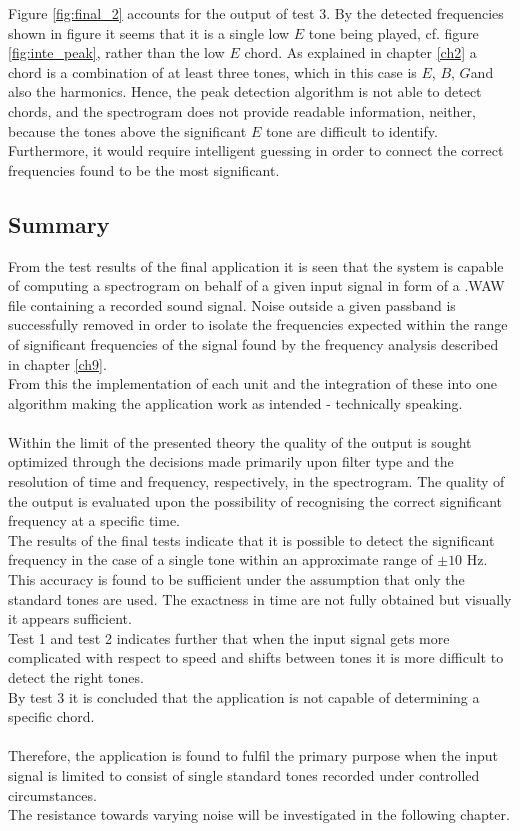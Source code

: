 Figure \ref{fig:final_2} accounts for the output of test 3. By the detected frequencies shown in figure \label{fig:final_peak2} it seems that it is a single low $E$ tone being played, cf. figure \ref{fig:inte_peak}, rather than the low $E$ chord. As explained in chapter \ref{ch2} a chord is a combination of at least three tones, which in this case is $E$, $B$, $G$\hashsharp and also the harmonics. Hence, the peak detection algorithm is not able to detect chords, and the spectrogram does not provide readable information, neither, because the tones above the significant $E$ tone are difficult to identify. Furthermore, it would require intelligent guessing in order to connect the correct frequencies found to be the most significant.

\subsection{Summary}
From the test results of the final application it is seen that the system is capable of computing a spectrogram on behalf of a given input signal in form of a .WAW file containing a recorded sound signal. Noise outside a given passband is successfully removed in order to isolate the frequencies expected within the range of significant frequencies of the signal found by the frequency analysis described in chapter \ref{ch9}. \\
From this the implementation of each unit and the integration of these into one algorithm making the application work as intended - technically speaking. \\
\\
Within the limit of the presented theory the quality of the output is sought optimized through the decisions made primarily upon filter type and the resolution of time and frequency, respectively, in the spectrogram.
The quality of the output is evaluated upon the possibility of recognising the correct significant frequency at a specific time. \\
The results of the final tests indicate that it is possible to detect the significant frequency in the case of a single tone within an approximate range of $\pm 10$ Hz. This accuracy is found to be sufficient under the assumption that only the standard tones are used. The exactness in time are not fully obtained but visually it appears sufficient. \\        
Test 1 and test 2 indicates further that when the input signal gets more complicated with respect to speed and shifts between tones it is more difficult to detect the right tones. \\
By test 3 it is concluded that the application is not capable of determining a specific chord. \\   
\\
Therefore, the application is found to fulfil the primary purpose when the input signal is limited to consist of single standard tones recorded under controlled circumstances. \\
The resistance towards varying noise will be investigated in the following chapter.